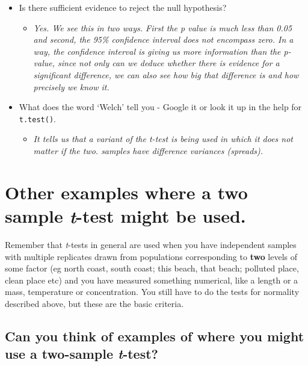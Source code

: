 \documentclass[
  letterpaper,
  DIV=11,
  numbers=noendperiod]{scrreprt}
\providecommand{\tightlist}{%
  \setlength{\itemsep}{0pt}\setlength{\parskip}{0pt}}\usepackage{longtable,booktabs,array}
\begin{document}
\begin{itemize}
  \begin{itemize}
  \tightlist
  \item
    \emph{The 95\% confidence interval has lower bound 0.8397 and upper
    bound 1.962.}
  \end{itemize}
\item
  Is there sufficient evidence to reject the null hypothesis?

  \begin{itemize}
  \tightlist
  \item
    \emph{Yes. We see this in two ways. First the p value is much less
    than 0.05 and second, the 95\% confidence interval does not
    encompass zero. In a way, the confidence interval is giving us more
    information than the p-value, since not only can we deduce whether
    there is evidence for a significant difference, we can also see how
    big that difference is and how precisely we know it.}
  \end{itemize}
\item
  What does the word `Welch' tell you - Google it or look it up in the
  help for \texttt{t.test()}.

  \begin{itemize}
  \tightlist
  \item
    \emph{It tells us that a variant of the t-test is being used in
    which it does not matter if the two. samples have difference
    variances (spreads).}
  \end{itemize}
\end{itemize}

\section{\texorpdfstring{Other examples where a two sample \emph{t}-test
might be
used.}{Other examples where a two sample t-test might be used.}}\label{other-examples-where-a-two-sample-t-test-might-be-used.}

Remember that \emph{t}-tests in general are used when you have
independent samples with multiple replicates drawn from populations
corresponding to \textbf{two} levels of some factor (eg north coast,
south coast; this beach, that beach; polluted place, clean place etc)
and you have measured something numerical, like a length or a mass,
temperature or concentration. You still have to do the tests for
normality described above, but these are the basic criteria.

\subsection{\texorpdfstring{Can you think of examples of where you might
use a two-sample
\emph{t}-test?}{Can you think of examples of where you might use a two-sample t-test?}}\label{can-you-think-of-examples-of-where-you-might-use-a-two-sample-t-test}
\end{document}
